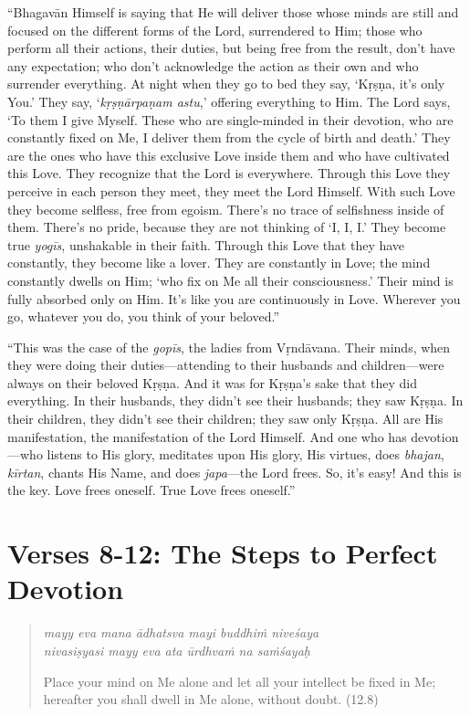 \documentclass[12pt, twoside, openright]{memoir}
\begin{document}
\enquote{Bhagavān Himself is saying that He will deliver those whose minds are still and focused on the different forms of the Lord, surrendered to Him; those who perform all their actions, their duties, but being free from the result, don’t have any expectation; who don’t acknowledge the action as their own and who surrender everything. At night when they go to bed they say, \enquote{Kṛṣṇa, it’s only You.} They say, \enquote{\textit{kṛṣṇārpaṇam astu},} offering everything to Him. The Lord says, \enquote{To them I give Myself. These who are single-minded in their devotion, who are constantly fixed on Me, I deliver them from the cycle of birth and death.} They are the ones who have this exclusive Love inside them and who have cultivated this Love. They recognize that the Lord is everywhere. Through this Love they perceive in each person they meet, they meet the Lord Himself. With such Love they become selfless, free from egoism. There’s no trace of selfishness inside of them. There’s no pride, because they are not thinking of \enquote{I, I, I.} They become true \textit{yogīs}, unshakable in their faith. Through this Love that they have constantly, they become like a lover. They are constantly in Love; the mind constantly dwells on Him; \enquote{who fix on Me all their consciousness.} Their mind is fully absorbed only on Him. It’s like you are continuously in Love. Wherever you go, whatever you do, you think of your beloved.}

\enquote{This was the case of the \textit{gopīs}, the ladies from Vṛndāvana. Their minds, when they were doing their duties---attending to their husbands and children---were always on their beloved Kṛṣṇa. And it was for Kṛṣṇa's sake that they did everything. In their husbands, they didn’t see their husbands; they saw Kṛṣṇa. In their children, they didn’t see their children; they saw only Kṛṣṇa. All are His manifestation, the manifestation of the Lord Himself. And one who has devotion---who listens to His glory, meditates upon His glory, His virtues, does \textit{bhajan}, \textit{kīrtan}, chants His Name, and does \textit{japa}---the Lord frees. So, it’s easy! And this is the key. Love frees oneself. True Love frees oneself.}

\section{Verses 8-12: The Steps to Perfect Devotion}\label{sec-verses-8-12-the-steps-to-perfect-devotion}


\par
\begin{verse}
\textit{mayy eva mana ādhatsva mayi buddhiṁ niveśaya} \\
\textit{nivasiṣyasi mayy eva ata ūrdhvaṁ na saṁśayaḥ}

\noindent Place your mind on Me alone and let all your intellect be fixed in Me; hereafter you shall dwell in Me alone, without doubt. (12.8)
\end{verse}
\par
\end{document}
